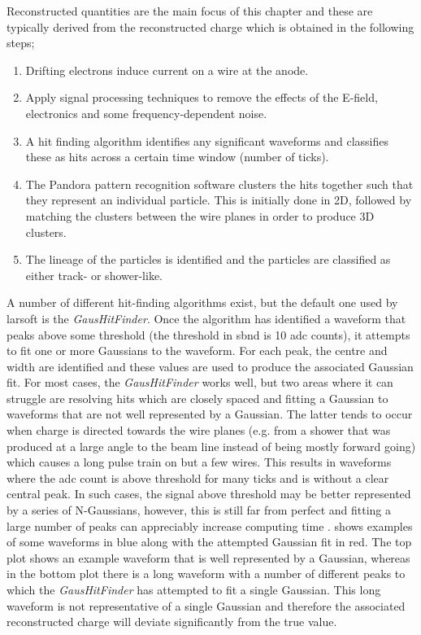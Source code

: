 Reconstructed quantities are the main focus of this chapter and these are typically derived from the reconstructed charge which is obtained in the following steps;
\begin{enumerate}
    \item Drifting electrons induce current on a wire at the anode.
    \item Apply signal processing techniques to remove the effects of the E-field, electronics and some frequency-dependent noise. 
    \item A hit finding algorithm identifies any significant waveforms and classifies these as hits across a certain time window (number of ticks). 
    \item The Pandora pattern recognition software clusters the hits together such that they represent an individual particle. This is initially done in 2D, followed by matching the clusters between the wire planes in order to produce 3D clusters.
    \item The lineage of the particles is identified and the particles are classified as either track- or shower-like.
\end{enumerate}

A number of different hit-finding algorithms exist, but the default one used by \gls{larsoft} is the \textit{GausHitFinder}. Once the algorithm has identified a waveform that peaks above some threshold (the threshold in \gls{sbnd} is 10 \gls{adc} counts), it attempts to fit one or more Gaussians to the waveform. For each peak, the centre and width are identified and these values are used to produce the associated Gaussian fit. For most cases, the \textit{GausHitFinder} works well, but two areas where it can struggle are resolving hits which are closely spaced and fitting a Gaussian to waveforms that are not well represented by a Gaussian. The latter tends to occur when charge is directed towards the wire planes (e.g. from a shower that was produced at a large angle to the beam line instead of being mostly forward going) which causes a long pulse train on but a few wires. This results in waveforms where the \gls{adc} count is above threshold for many ticks and is without a clear central peak. In such cases, the signal above threshold may be better represented by a series of N-Gaussians, however, this is still far from perfect and fitting a large number of peaks can appreciably increase computing time \cite{gaushitfinder}.  shows examples of some waveforms in blue along with the attempted Gaussian fit in red. The top plot shows an example waveform that is well represented by a Gaussian, whereas in the bottom plot there is a long waveform with a number of different peaks to which the \textit{GausHitFinder} has attempted to fit a single Gaussian. This long waveform is not representative of a single Gaussian and therefore the associated reconstructed charge will deviate significantly from the true value.


